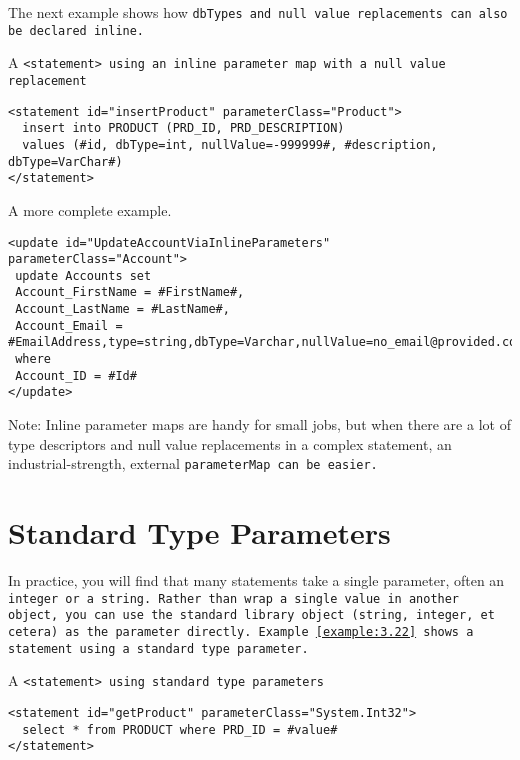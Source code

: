 The next example shows how \tt{dbTypes} and null value replacements can also
be declared inline.

\begin{example}\label{example:3.20}
A \tt{<statement>} using an inline parameter map with a null value replacement
\begin{verbatim}
<statement id="insertProduct" parameterClass="Product">
  insert into PRODUCT (PRD_ID, PRD_DESCRIPTION)
  values (#id, dbType=int, nullValue=-999999#, #description, dbType=VarChar#)
</statement>
\end{verbatim}
\end{example}

\begin{example}\label{example:3.21}
A more complete example.
\begin{verbatim}
<update id="UpdateAccountViaInlineParameters" parameterClass="Account">
 update Accounts set
 Account_FirstName = #FirstName#,
 Account_LastName = #LastName#,
 Account_Email = #EmailAddress,type=string,dbType=Varchar,nullValue=no_email@provided.com#
 where
 Account_ID = #Id#
</update>
\end{verbatim}
\end{example}

\begin{mybox}{Note:}
Inline parameter maps are handy for small jobs, but when there are a lot of
type descriptors and null value replacements in a complex statement, an
industrial-strength, external \tt{parameterMap} can be easier.
\end{mybox}

\section{Standard Type Parameters}
In practice, you will find that many statements take a single parameter, often
an \tt{integer} or a \tt{string}. Rather than wrap a single value in another
object, you can use the standard library object (string, integer, et cetera)
as the parameter directly. Example~\ref{example:3.22} shows a statement using
a standard type parameter.

\begin{example}\label{example:3.22}
A \tt{<statement>} using standard type parameters
\begin{verbatim}
<statement id="getProduct" parameterClass="System.Int32">
  select * from PRODUCT where PRD_ID = #value#
</statement>
\end{verbatim}
\end{example}

